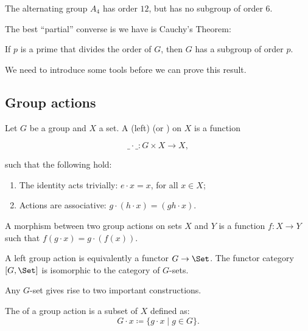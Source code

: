 \documentclass[12pt]{report}
\newenvironment{categorybox}{\begin{bluebox}}{\end{bluebox}}
\begin{document}
\begin{example}
  The alternating group \(A_{4}\) has order \(12\), but has no subgroup of order 6.
\end{example}

The best ``partial'' converse is we have is Cauchy's Theorem:

\begin{theorem}\label{thm:group-theory:cauchys-theorem}
  If \(p\) is a prime that divides the order of \(G\), then \(G\) has a subgroup of order \(p\).
\end{theorem}

We need to introduce some tools before we can prove this result.

\subsection{Group actions}

\begin{definition}\label{def:group-theory:group-action}
  Let \(G\) be a group and \(X\) a set. A (left)  (or ) on \(X\) is a function

  \[\_ \cdot \_ :  G \times X \to X,\]

  such that the following hold:

  \begin{enumerate}
    \item The identity acts trivially: \(e \cdot x = x\), for all \(x \in X\);
    \item Actions are associative: \(g \cdot (h \cdot x) = (gh \cdot x)\).
  \end{enumerate}

  A morphism between two group actions on sets \(X\) and \(Y\) is a function \(f: X \to Y\) such that \(f(g\cdot x) = g \cdot (f(x))\).
\end{definition}

\begin{categorybox}
  A left group action is equivalently a functor \(G \to \Set\). The functor category \([G, \Set]\) is isomorphic to the category of \(G\)-sets.
\end{categorybox}

Any \(G\)-set gives rise to two important constructions.

\begin{definition}\label{def:group-theory:orbit}
  The  of a group action is a subset of \(X\) defined as:
  \[G \cdot x \coloneqq \{g \cdot x \mid g \in G\}.\]
\end{definition}
\end{document}
